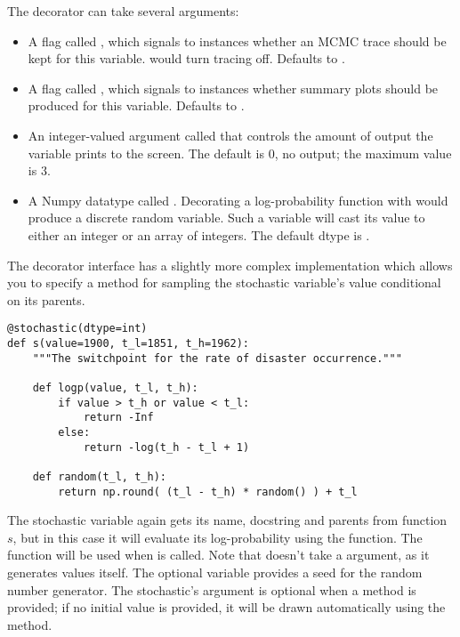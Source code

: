 \begin{description}
    The decorator  can take several arguments:
    \begin{itemize}
        \item A flag called , which signals to  instances whether an MCMC trace should be kept for this variable.  would turn tracing off. Defaults to .
        \item A flag called , which signals to  instances whether summary plots should be produced for this variable. Defaults to .
        \item An integer-valued argument called  that controls the amount of output the variable prints to the screen. The default is $0$, no output; the maximum value is $3$.
        \item A Numpy datatype called . Decorating a log-probability function with  would produce a discrete random variable. Such a variable will cast its value to either an integer or an array of integers. The default dtype is .
    \end{itemize}

    The decorator interface has a slightly more complex implementation which allows you to specify a  method for sampling the stochastic variable's value conditional on its parents.
    \begin{verbatim}
@stochastic(dtype=int)
def s(value=1900, t_l=1851, t_h=1962):
    """The switchpoint for the rate of disaster occurrence."""

    def logp(value, t_l, t_h):
        if value > t_h or value < t_l:
            return -Inf
        else:
            return -log(t_h - t_l + 1)

    def random(t_l, t_h):
        return np.round( (t_l - t_h) * random() ) + t_l

    \end{verbatim}
The stochastic variable again gets its name, docstring and parents from function $s$, but in this case it will evaluate its log-probability using the  function. The  function will be used when  is called. Note that  doesn't take a  argument, as it generates values itself. The optional  variable provides a seed for the random number generator. The stochastic's  argument is optional when a  method is provided; if no initial value is provided, it will be drawn automatically using the  method.


\end{description}
